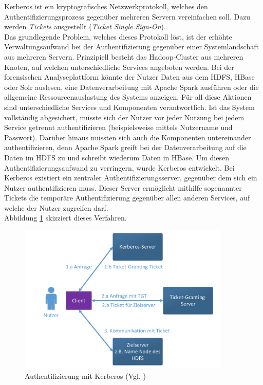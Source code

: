 \noindent
Kerberos ist ein kryptografisches Netzwerkprotokoll, welches den Authentifizierungsprozess gegenüber mehreren Servern vereinfachen soll. Dazu werden \textit{Tickets} ausgestellt (\textit{Ticket Single Sign-On}).\cite[S. 425-429]{crypto}\\
Das grundlegende Problem, welches dieses Protokoll löst, ist der erhöhte Verwaltungsaufwand bei der Authentifizierung gegenüber einer Systemlandschaft aus mehreren Servern. Prinzipiell besteht das Hadoop-Cluster aus mehreren Knoten, auf welchen unterschiedliche Services angeboten werden. Bei der forensischen Analyseplattform könnte der Nutzer Daten aus dem HDFS, HBase oder Solr auslesen, eine Datenverarbeitung mit Apache Spark ausführen oder die allgemeine Ressourcenauslastung des Systems anzeigen. Für all diese Aktionen sind unterschiedliche Services und Komponenten verantwortlich. 
Ist das System vollständig abgesichert, müsste sich der Nutzer vor jeder Nutzung bei jedem Service getrennt authentifizieren (beispielsweise mittels Nutzername und Passwort). Darüber hinaus müssten sich auch die Komponenten untereinander authentifizieren, denn Apache Spark greift bei der Datenverarbeitung auf die Daten im HDFS zu und schreibt wiederum Daten in HBase. Um diesen Authentifizierungsaufwand zu verringern, wurde Kerberos entwickelt. 
Bei Kerberos existiert ein zentraler Authentifizierungsserver, gegenüber dem sich ein Nutzer authentifizieren muss. Dieser Server ermöglicht mithilfe sogenannter Tickets die temporäre Authentifizierung gegenüber allen anderen Services, auf welche der Nutzer zugreifen darf.\cite[S. 425-429]{crypto}\\
Abbildung \ref{fig:kerberos} skizziert dieses Verfahren. 
\begin{figure}[ht]
  \centering
  \includegraphics[width=0.9\textwidth]{./resource/kerberos_authentification.pdf}
  \caption{Authentifizierung mit Kerberos (Vgl. \cite[S.426]{crypto})}
  \label{fig:kerberos}
\end{figure}

